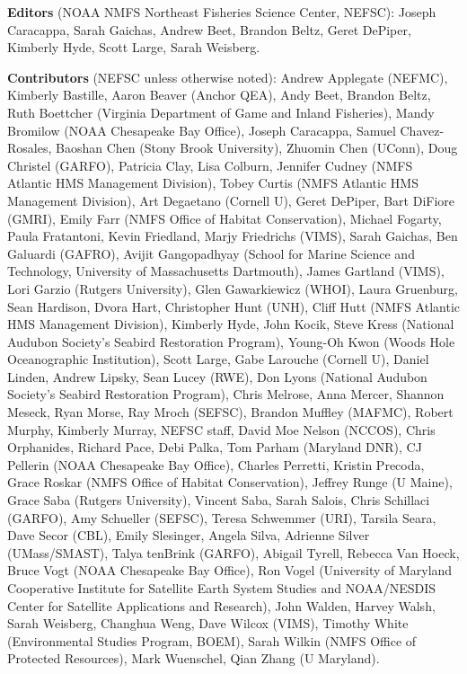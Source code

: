 \documentclass[
  10pt,
]{article}
\begin{document}
\textbf{Editors} (NOAA NMFS Northeast Fisheries Science Center, NEFSC): Joseph Caracappa, Sarah Gaichas, Andrew Beet, Brandon Beltz, Geret DePiper, Kimberly Hyde, Scott Large, Sarah Weisberg.

\textbf{Contributors} (NEFSC unless otherwise noted): Andrew Applegate (NEFMC), Kimberly Bastille, Aaron Beaver (Anchor QEA), Andy Beet, Brandon Beltz, Ruth Boettcher (Virginia Department of Game and Inland Fisheries), Mandy Bromilow (NOAA Chesapeake Bay Office), Joseph Caracappa, Samuel Chavez-Rosales, Baoshan Chen (Stony Brook University), Zhuomin Chen (UConn), Doug Christel (GARFO), Patricia Clay, Lisa Colburn, Jennifer Cudney (NMFS Atlantic HMS Management Division), Tobey Curtis (NMFS Atlantic HMS Management Division), Art Degaetano (Cornell U), Geret DePiper, Bart DiFiore (GMRI), Emily Farr (NMFS Office of Habitat Conservation), Michael Fogarty, Paula Fratantoni, Kevin Friedland, Marjy Friedrichs (VIMS), Sarah Gaichas, Ben Galuardi (GAFRO), Avijit Gangopadhyay (School for Marine Science and Technology, University of Massachusetts Dartmouth), James Gartland (VIMS), Lori Garzio (Rutgers University), Glen Gawarkiewicz (WHOI), Laura Gruenburg, Sean Hardison, Dvora Hart, Christopher Hunt (UNH), Cliff Hutt (NMFS Atlantic HMS Management Division), Kimberly Hyde, John Kocik, Steve Kress (National Audubon Society's Seabird Restoration Program), Young-Oh Kwon (Woods Hole Oceanographic Institution), Scott Large, Gabe Larouche (Cornell U), Daniel Linden, Andrew Lipsky, Sean Lucey (RWE), Don Lyons (National Audubon Society's Seabird Restoration Program), Chris Melrose, Anna Mercer, Shannon Meseck, Ryan Morse, Ray Mroch (SEFSC), Brandon Muffley (MAFMC), Robert Murphy, Kimberly Murray, NEFSC staff, David Moe Nelson (NCCOS), Chris Orphanides, Richard Pace, Debi Palka, Tom Parham (Maryland DNR), CJ Pellerin (NOAA Chesapeake Bay Office), Charles Perretti, Kristin Precoda, Grace Roskar (NMFS Office of Habitat Conservation), Jeffrey Runge (U Maine), Grace Saba (Rutgers University), Vincent Saba, Sarah Salois, Chris Schillaci (GARFO), Amy Schueller (SEFSC), Teresa Schwemmer (URI), Tarsila Seara, Dave Secor (CBL), Emily Slesinger, Angela Silva, Adrienne Silver (UMass/SMAST), Talya tenBrink (GARFO), Abigail Tyrell, Rebecca Van Hoeck, Bruce Vogt (NOAA Chesapeake Bay Office), Ron Vogel (University of Maryland Cooperative Institute for Satellite Earth System Studies and NOAA/NESDIS Center for Satellite Applications and Research), John Walden, Harvey Walsh, Sarah Weisberg, Changhua Weng, Dave Wilcox (VIMS), Timothy White (Environmental Studies Program, BOEM), Sarah Wilkin (NMFS Office of Protected Resources), Mark Wuenschel, Qian Zhang (U Maryland).
\end{document}
